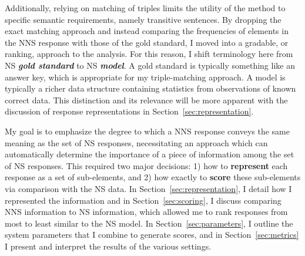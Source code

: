 Additionally, relying on matching of triples limits the utility of the method to specific semantic requirements, namely transitive sentences. By dropping the exact matching approach and instead comparing the frequencies of elements in the NNS response with those of the gold standard, I moved into a gradable, or ranking, approach to the analysis. For this reason, I shift terminology here from NS \textit{\textbf{gold standard}} to NS \textit{\textbf{model}}. A gold standard is typically something like an answer key, which is appropriate for my triple-matching approach. A model is typically a richer data structure containing statistics from observations of known correct data. This distinction and its relevance will be more apparent with the discussion of response representations in Section~\ref{sec:representation}.

My goal is to emphasize the degree to which a NNS response conveys the same
meaning as the set of NS responses, necessitating an approach which can automatically
determine the importance of a piece of information among the set of NS responses.  This required two major decisions: 1) how to \textbf{represent} each response as a set of sub-elements, and 2) how exactly to \textbf{score} these sub-elements via comparison with the NS data. In Section~\ref{sec:representation}, I detail how I represented the information and in Section~\ref{sec:scoring}, I discuss comparing NNS information to NS information, which allowed me to rank responses from most to least similar to the NS model. In Section~\ref{sec:parameters}, I outline the system parameters that I combine to generate scores, and in Section~\ref{sec:metrics} I present and interpret the results of the various settings.

%
%

